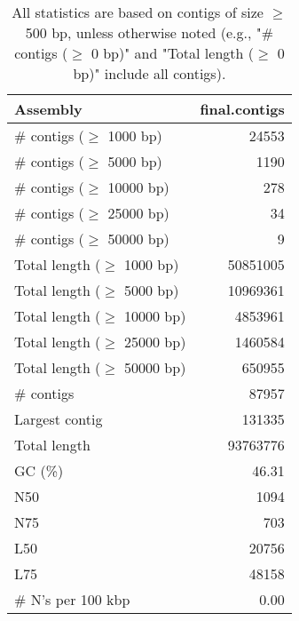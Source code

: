 \documentclass[12pt,a4paper]{article}
\begin{document}
\begin{table}[ht]
\begin{center}
\caption{All statistics are based on contigs of size $\geq$ 500 bp, unless otherwise noted (e.g., "\# contigs ($\geq$ 0 bp)" and "Total length ($\geq$ 0 bp)" include all contigs).}
\begin{tabular}{|l*{1}{|r}|}
\hline
Assembly & final.contigs \\ \hline
\# contigs ($\geq$ 1000 bp) & 24553 \\ \hline
\# contigs ($\geq$ 5000 bp) & 1190 \\ \hline
\# contigs ($\geq$ 10000 bp) & 278 \\ \hline
\# contigs ($\geq$ 25000 bp) & 34 \\ \hline
\# contigs ($\geq$ 50000 bp) & 9 \\ \hline
Total length ($\geq$ 1000 bp) & 50851005 \\ \hline
Total length ($\geq$ 5000 bp) & 10969361 \\ \hline
Total length ($\geq$ 10000 bp) & 4853961 \\ \hline
Total length ($\geq$ 25000 bp) & 1460584 \\ \hline
Total length ($\geq$ 50000 bp) & 650955 \\ \hline
\# contigs & 87957 \\ \hline
Largest contig & 131335 \\ \hline
Total length & 93763776 \\ \hline
GC (\%) & 46.31 \\ \hline
N50 & 1094 \\ \hline
N75 & 703 \\ \hline
L50 & 20756 \\ \hline
L75 & 48158 \\ \hline
\# N's per 100 kbp & 0.00 \\ \hline
\end{tabular}
\end{center}
\end{table}
\end{document}
